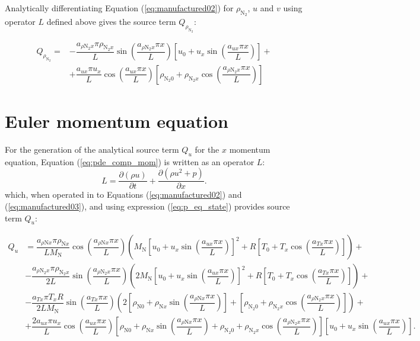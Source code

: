 \documentclass[10pt]{article}
\newcommand{\Diff}[2] {\dfrac{\partial( #1)}{\partial #2}}
\begin{document}
Analytically differentiating Equation (\ref{eq:manufactured02}) for $\rho_{\text{N}_2}$, $u$ and $v$ using operator $L$ defined above  gives the source term $Q_{\rho_{\text{N}_2}}$:

\begin{equation}
\begin{split}
Q_{\rho_{\text{N}_2}} = &- \dfrac{a_{ \rho \text{N}_2 x } \pi \rho_{\text{N}_2 x}}{L}\sin\left( \dfrac{a_{ \rho \text{N}_2 x } \pi x}{L}\right) \left[u_0+u_x \sin\left( \dfrac{a_{ux} \pi x}{L}\right)\right] + \\
&+\dfrac{a_{ux} \pi u_x }{L}\cos\left( \dfrac{a_{ux} \pi x}{L}\right) \left[\rho_{\text{N}_2 0}+\rho_{\text{N}_2 x} \cos\left( \dfrac{a_{ \rho \text{N}_2 x } \pi x}{L}\right)\right]
\end{split}
\end{equation}




\section{Euler momentum equation}

For the generation of the analytical source term $Q_u$ for the $x$ momentum equation, Equation (\ref{eq:pde_comp_mom}) is written as an operator $L$:
\begin{equation}
 \label{eq:euler1d_12}
L=\Diff{\rho u}{t} + \Diff{\rho u^2 +p}{x}.
\end{equation}
which, when operated in to Equations (\ref{eq:manufactured02}) and (\ref{eq:manufactured03}), and using expression (\ref{eq:p_eq_state}) provides source term $Q_{u}$:

\begin{equation}
\begin{split}
Q_u &= \dfrac{a_{\rho \text{N} x} \pi \rho_{\text{N}x}}{L M_\text{N}}\cos\left(\dfrac{a_{\rho \text{N} x} \pi x}{L}\right)\left(M_\text{N} \left[u_0+u_x \sin\left(\dfrac{a_{ux} \pi x}{L}\right)\right]^2+R\left[T_0+T_x \cos\left(\dfrac{a_{Tx} \pi x}{L}\right)\right]\right)   +\\
& -\dfrac{a_{\rho \text{N}_2 x} \pi \rho_{\text{N}_2 x}}{2L}\sin\left(\dfrac{a_{\rho \text{N}_2 x} \pi x}{L}\right)\left(2M_\text{N}\left[u_0+u_x \sin\left(\dfrac{a_{ux} \pi x}{L}\right)\right]^2+R\left[T_0+T_x \cos\left(\dfrac{a_{Tx} \pi x}{L}\right)\right]\right)   +\\
& -\dfrac{a_{Tx} \pi T_x R}{2 L M_\text{N}}\sin\left(\dfrac{a_{Tx} \pi x}{L}\right)\left(2 \left[\rho_{\text{N}0}+\rho_{\text{N}x} \sin\left(\dfrac{a_{\rho \text{N} x} \pi x}{L}\right)\right]+\left[\rho_{\text{N}_2 0}+\rho_{\text{N}_2 x} \cos\left(\dfrac{a_{\rho \text{N}_2 x} \pi x}{L}\right)\right]\right)   +\\
& +\dfrac{2a_{ux} \pi u_x }{L}\cos\left(\dfrac{a_{ux} \pi x}{L}\right) \left[\rho_{\text{N}0}+\rho_{\text{N}x} \sin\left(\dfrac{a_{\rho \text{N} x} \pi x}{L}\right)+\rho_{\text{N}_2 0}+\rho_{\text{N}_2 x} \cos\left(\dfrac{a_{\rho \text{N}_2 x} \pi x}{L}\right)\right] \left[u_0+u_x \sin\left(\dfrac{a_{ux} \pi x}{L}\right)\right].
\end{split}
\end{equation}
\end{document}
